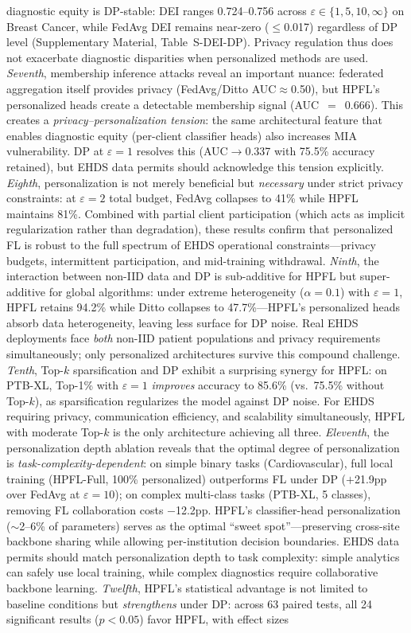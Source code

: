 \documentclass[conference,a4paper]{IEEEtran}
\begin{document}
diagnostic equity is DP-stable: DEI ranges 0.724--0.756 across $\varepsilon \in \{1, 5, 10, \infty\}$ on Breast Cancer, while FedAvg DEI remains near-zero ($\leq$0.017) regardless of DP level (Supplementary Material, Table~S-DEI-DP). Privacy regulation thus does not exacerbate diagnostic disparities when personalized methods are used. \textit{Seventh}, membership inference attacks reveal an important nuance: federated aggregation itself provides privacy (FedAvg/Ditto AUC$\approx$0.50), but HPFL's personalized heads create a detectable membership signal (AUC~$=$~0.666). This creates a \textit{privacy--personalization tension}: the same architectural feature that enables diagnostic equity (per-client classifier heads) also increases MIA vulnerability. DP at $\varepsilon{=}1$ resolves this (AUC$\to$0.337 with 75.5\% accuracy retained), but EHDS data permits should acknowledge this tension explicitly. \textit{Eighth}, personalization is not merely beneficial but \textit{necessary} under strict privacy constraints: at $\varepsilon{=}2$ total budget, FedAvg collapses to 41\% while HPFL maintains 81\%. Combined with partial client participation (which acts as implicit regularization rather than degradation), these results confirm that personalized FL is robust to the full spectrum of EHDS operational constraints---privacy budgets, intermittent participation, and mid-training withdrawal. \textit{Ninth}, the interaction between non-IID data and DP is sub-additive for HPFL but super-additive for global algorithms: under extreme heterogeneity ($\alpha{=}0.1$) with $\varepsilon{=}1$, HPFL retains 94.2\% while Ditto collapses to 47.7\%---HPFL's personalized heads absorb data heterogeneity, leaving less surface for DP noise. Real EHDS deployments face \textit{both} non-IID patient populations and privacy requirements simultaneously; only personalized architectures survive this compound challenge. \textit{Tenth}, Top-$k$ sparsification and DP exhibit a surprising synergy for HPFL: on PTB-XL, Top-1\% with $\varepsilon{=}1$ \textit{improves} accuracy to 85.6\% (vs.\ 75.5\% without Top-$k$), as sparsification regularizes the model against DP noise. For EHDS requiring privacy, communication efficiency, and scalability simultaneously, HPFL with moderate Top-$k$ is the only architecture achieving all three. \textit{Eleventh}, the personalization depth ablation reveals that the optimal degree of personalization is \textit{task-complexity-dependent}: on simple binary tasks (Cardiovascular), full local training (HPFL-Full, 100\% personalized) outperforms FL under DP ($+$21.9pp over FedAvg at $\varepsilon{=}10$); on complex multi-class tasks (PTB-XL, 5 classes), removing FL collaboration costs $-$12.2pp. HPFL's classifier-head personalization ($\sim$2--6\% of parameters) serves as the optimal ``sweet spot''---preserving cross-site backbone sharing while allowing per-institution decision boundaries. EHDS data permits should match personalization depth to task complexity: simple analytics can safely use local training, while complex diagnostics require collaborative backbone learning. \textit{Twelfth}, HPFL's statistical advantage is not limited to baseline conditions but \textit{strengthens} under DP: across 63 paired tests, all 24 significant results ($p{<}0.05$) favor HPFL, with effect sizes 
\end{document}
